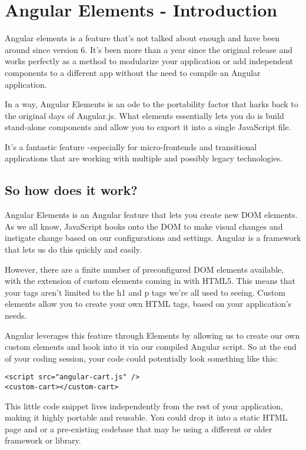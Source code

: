 \chapter{ Angular Elements - Introduction }

Angular elements is a feature that's not talked about enough and have been around since version 6. It's been more than a year since the original release and works perfectly as a method to modularize your application or add independent components to a different app without the need to compile an Angular application.

In a way, Angular Elements is an ode to the portability factor that harks back to the original days of Angular.js. What elements essentially lets you do is build stand-alone components and allow you to export it into a single JavaScript file. 

It's a fantastic feature - especially for micro-frontends and transitional applications that are working with multiple and possibly legacy technologies. 

\section{So how does it work?}

Angular Elements is an Angular feature that lets you create new DOM elements. As we all know, JavaScript hooks onto the DOM to make visual changes and instigate change based on our configurations and settings. Angular is a framework that lets us do this quickly and easily.

However, there are a finite number of preconfigured DOM elements available, with the extension of custom elements coming in with HTML5. This means that your tags aren't limited to the h1 and p tags we're all used to seeing. 
Custom elements allow you to create your own HTML tags, based on your application's needs. 

Angular leverages this feature through Elements by allowing us to create our own custom elements and hook into it via our compiled Angular script. 
So at the end of your coding session, your code could potentially look something like this:

\begin{verbatim}
<script src="angular-cart.js" />
<custom-cart></custom-cart>
\end{verbatim}

This little code snippet lives independently from the rest of your application, making it highly portable and reusable. You could drop it into a static HTML page and or a pre-existing codebase that may be using a different or older framework or library.

